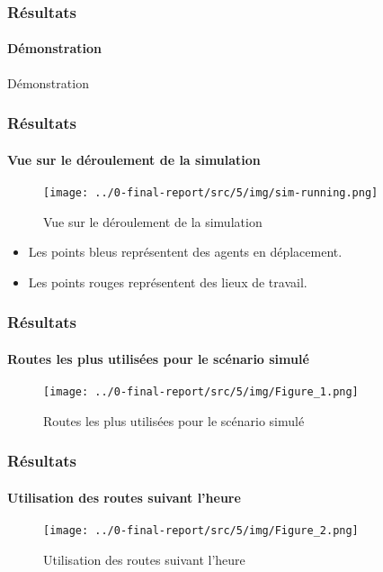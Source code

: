 \begin{frame}
    \frametitle{Résultats}
    \framesubtitle{Démonstration}

    \begin{center}
        Démonstration
    \end{center}
\end{frame}

\begin{frame}
    \frametitle{Résultats}
    \framesubtitle{Vue sur le déroulement de la simulation}

    \begin{figure}[H]
        \centering
        \texttt{[image: ../0-final-report/src/5/img/sim-running.png]}
        \caption{Vue sur le déroulement de la simulation}
        \label{fig:simulateur-running}
    \end{figure}
    \begin{itemize}
        \item Les points bleus représentent des agents en déplacement.
        \item Les points rouges représentent des lieux de travail.
    \end{itemize}
\end{frame}

\begin{frame}
    \frametitle{Résultats}
    \framesubtitle{Routes les plus utilisées pour le scénario simulé}

    \begin{figure}[h]
        \centering
        \texttt{[image: ../0-final-report/src/5/img/Figure\_1.png]}
        \caption{Routes les plus utilisées pour le scénario simulé}
        \label{fig:top_used_road}
    \end{figure}

\end{frame}

\begin{frame}
    \frametitle{Résultats}
    \framesubtitle{Utilisation des routes suivant l'heure}

    \begin{figure}[h]
        \centering
        \texttt{[image: ../0-final-report/src/5/img/Figure\_2.png]}
        \caption{Utilisation des routes suivant l'heure}
        \label{fig:road_usage_hour}
    \end{figure}

\end{frame}

